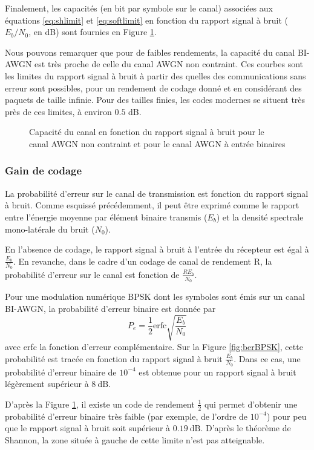 Finalement, les capacités (en bit par symbole sur le canal) associées aux équations \ref{eq:shlimit} et \ref{eq:softlimit}
en fonction du rapport signal à bruit ($E_b/N_0$, en dB) sont fournies en Figure \ref{fig:capacity}.

Nous pouvons remarquer que pour de faibles rendements, la capacité du canal BI-AWGN est très proche de celle du canal 
AWGN non contraint. Ces courbes sont les limites du rapport signal à bruit à partir des quelles des communications sans 
erreur sont possibles, pour un rendement de codage donné et en considérant des paquets de taille infinie. Pour des 
tailles finies, les codes modernes se situent très près de ces limites, à environ $0.5$ dB.
\begin{figure}[!h]
	\centering
	
	\caption{\label{fig:capacity} Capacité du canal en fonction du rapport signal à bruit pour le canal AWGN non contraint 
	et pour le canal AWGN à entrée binaires}
\end{figure}
\subsubsection{Gain de codage}
La probabilité d'erreur sur le canal de transmission est fonction du rapport signal à bruit. Comme esquissé précédemment, 
il peut être exprimé comme le rapport entre l'énergie moyenne par élément binaire transmis ($E_b$) et la densité 
spectrale mono-latérale du bruit ($N_0$).

En l'absence de codage, le rapport signal à bruit à l'entrée du récepteur est égal à $\frac{E_b}{N_0}$. En revanche, 
dans le cadre d'un codage de canal de rendement R, la probabilité d'erreur sur le canal est fonction de $\frac{RE_b}{N_0}$.

Pour une modulation numérique BPSK dont les symboles sont émis sur un canal BI-AWGN, la probabilité d'erreur binaire est
donnée par 
\begin{equation}
	P_e = \frac{1}{2} \text{erfc}\sqrt{\frac{E_b}{N_0}}
\end{equation}
avec erfc la fonction d'erreur complémentaire.
Sur la Figure \ref{fig:berBPSK}, cette probabilité est tracée en fonction du rapport signal à bruit $\frac{E_b}{N_0}$.
Dans ce cas, une probabilité d'erreur binaire de $10^{-4}$ est obtenue pour un rapport signal à bruit légèrement 
supérieur à $8~\text{dB}$. 

D'après la Figure \ref{fig:capacity}, il existe un code de rendement $\frac{1}{2}$ qui permet d'obtenir une probabilité 
d'erreur binaire très faible (par exemple, de l'ordre de $10^{-4}$) pour peu que le rapport signal à bruit soit supérieur 
à $0.19~\text{dB}$. D'après le théorème de Shannon, la zone située à gauche de cette limite n'est pas atteignable.

